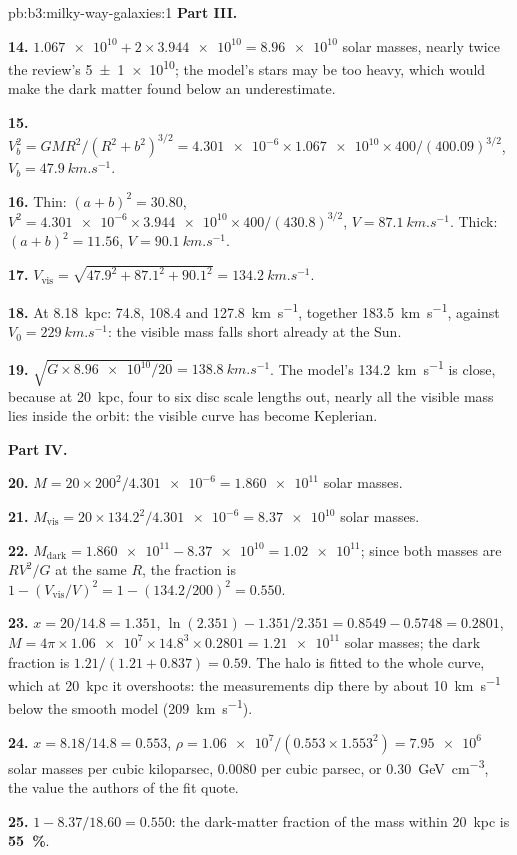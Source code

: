 \begin{solution}{pb:b3:milky-way-galaxies:1}
\textbf{Part III.}

\textbf{14.} $\num{1.067e10} + 2\times\num{3.944e10} = \num{8.96e10}$ solar
masses, nearly twice the review's \num[separate-uncertainty=true]{5 \pm 1 e10}; the model's stars
may be too heavy, which would make the dark matter found below an
underestimate.

\textbf{15.} $V_b^2 = GMR^2/(R^2 + b^2)^{3/2} = \num{4.301e-6}\times\num{1.067e10}
\times400/(400.09)^{3/2}$, $V_b = \qty{47.9}{km.s^{-1}}$.

\textbf{16.} Thin: $(a + b)^2 = 30.80$, $V^2 = \num{4.301e-6}\times\num{3.944e10}
\times400/(430.8)^{3/2}$, $V = \qty{87.1}{km.s^{-1}}$. Thick:
$(a + b)^2 = 11.56$, $V = \qty{90.1}{km.s^{-1}}$.

\textbf{17.} $V_\mathrm{vis} = \sqrt{47.9^2 + 87.1^2 + 90.1^2} =
\qty{134.2}{km.s^{-1}}$.

\textbf{18.} At \qty{8.18}{kpc}: 74.8, 108.4 and \qty{127.8}{km.s^{-1}},
together \qty{183.5}{km.s^{-1}}, against $V_0 = \qty{229}{km.s^{-1}}$:
the visible mass falls short already at the Sun.

\textbf{19.} $\sqrt{G\times\num{8.96e10}/20} = \qty{138.8}{km.s^{-1}}$. The
model's \qty{134.2}{km.s^{-1}} is close, because at \qty{20}{kpc},
four to six disc scale lengths out, nearly all the visible mass lies
inside the orbit: the visible curve has become Keplerian.

\textbf{Part IV.}

\textbf{20.} $M = 20\times200^2/\num{4.301e-6} = \num{1.860e11}$ solar masses.

\textbf{21.} $M_\mathrm{vis} = 20\times134.2^2/\num{4.301e-6} = \num{8.37e10}$
solar masses.

\textbf{22.} $M_\mathrm{dark} = \num{1.860e11} - \num{8.37e10} = \num{1.02e11}$;
since both masses are $RV^2/G$ at the same $R$, the fraction is
$1 - (V_\mathrm{vis}/V)^2 = 1 - (134.2/200)^2 = \num{0.550}$.

\textbf{23.} $x = 20/14.8 = 1.351$, $\ln(2.351) - 1.351/2.351 = 0.8549 - 0.5748
= 0.2801$, $M = 4\pi\times\num{1.06e7}\times14.8^3\times0.2801 =
\num{1.21e11}$ solar masses; the dark fraction is
$1.21/(1.21 + 0.837) = \num{0.59}$. The halo is fitted to the whole
curve, which at \qty{20}{kpc} it overshoots: the measurements dip there
by about \qty{10}{km.s^{-1}} below the smooth model (\qty{209}{km.s^{-1}}).

\textbf{24.} $x = 8.18/14.8 = 0.553$, $\rho = \num{1.06e7}/(0.553\times1.553^2)
= \num{7.95e6}$ solar masses per cubic kiloparsec, \num{0.0080} per
cubic parsec, or \qty{0.30}{GeV.cm^{-3}}, the value the authors of the
fit quote.

\textbf{25.} $1 - 8.37/18.60 = \num{0.550}$: the dark-matter fraction of the
mass within \qty{20}{kpc} is
\textbf{\qty[text-series-to-math=true]{55}{\percent}}.
\end{solution}
